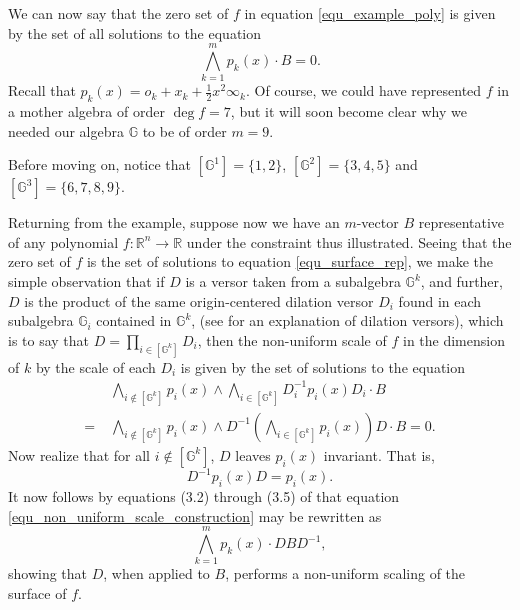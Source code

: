\documentclass{birkjour}
\theoremstyle{definition}
\theoremstyle{remark}
\numberwithin{equation}{section}
\newcommand{\R}{\mathbb{R}}
\newcommand{\G}{\mathbb{G}}
\newcommand{\nvai}{\infty}
\newcommand{\nvao}{o}
\begin{document}
We can now say that the zero set of $f$ in equation \eqref{equ_example_poly}
is given by the set of all solutions to the equation
\begin{equation}\label{equ_surface_rep}
\bigwedge_{k=1}^m p_k(x)\cdot B = 0.
\end{equation}
Recall that $p_k(x)=\nvao_k+x_k+\frac{1}{2}x^2\nvai_k$.
Of course, we could have represented $f$ in a mother algebra of order $\deg f=7$,
but it will soon become clear why we needed our algebra $\G$ to be of order $m=9$.

Before moving on, notice that $[\G^1]=\{1,2\}$, $[\G^2]=\{3,4,5\}$ and
$[\G^3]=\{6,7,8,9\}$.

Returning from the example, suppose now we have an $m$-vector $B$ representative
of any polynomial $f:\R^n\to\R$ under the constraint thus illustrated.  Seeing that
the zero set of $f$ is the set of solutions to equation \eqref{equ_surface_rep},
we make the simple observation that if $D$ is a versor taken from a subalgebra $\G^k$,
and further, $D$ is the product of the same origin-centered dilation versor $D_i$ found in each subalgebra
$\G_i$ contained in $\G^k$, (see \cite{Dorst07} for an explanation of dilation versors),
which is to say that $D=\prod_{i\in [\G^k]} D_i$,
then the non-uniform scale of $f$ in the dimension of $k$ by the scale of each
$D_i$ is given by the set of solutions to the equation
\begin{align}
  & \bigwedge_{i\not\in [\G^k]} p_i(x)\wedge\bigwedge_{i\in[\G^k]} D_i^{-1}p_i(x)D_i\cdot B \nonumber \\
 =\; & \bigwedge_{i\not\in [\G^k]} p_i(x)\wedge D^{-1}\left(\bigwedge_{i\in [\G^k]} p_i(x)\right)D\cdot B = 0.\label{equ_non_uniform_scale_construction}
\end{align}
Now realize that for all $i\not\in[\G^k]$, $D$ leaves $p_i(x)$ invariant.  That is,
\begin{equation*}
D^{-1}p_i(x)D=p_i(x).
\end{equation*}
It now follows by equations (3.2) through (3.5) of \cite{Parkin13} that equation \eqref{equ_non_uniform_scale_construction}
may be rewritten as
\begin{equation*}
\bigwedge_{k=1}^m p_k(x)\cdot DBD^{-1},
\end{equation*}
showing that $D$, when applied to $B$, performs a non-uniform scaling of the surface of $f$.
\end{document}
